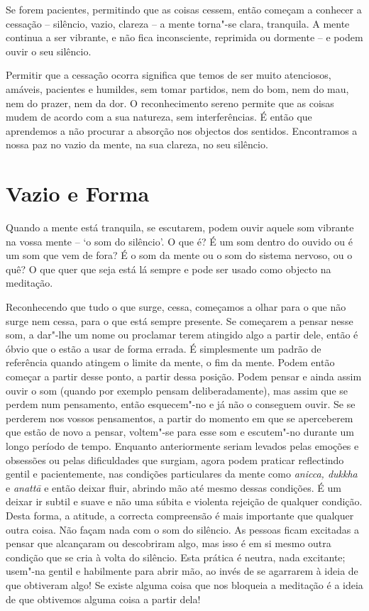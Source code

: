 Se forem pacientes, permitindo que as coisas cessem, então começam a
conhecer a cessação -- silêncio, vazio, clareza -- a mente torna"-se
clara, tranquila. A mente continua a ser vibrante, e não fica
inconsciente, reprimida ou dormente  --  e podem ouvir o seu silêncio.

Permitir que a cessação ocorra significa que temos de ser muito
atenciosos, amáveis, pacientes e humildes, sem tomar partidos, nem do
bom, nem do mau, nem do prazer, nem da dor. O reconhecimento sereno
permite que as coisas mudem de acordo com a sua natureza, sem
interferências. É então que aprendemos a não procurar a absorção nos
objectos dos sentidos. Encontramos a nossa paz no vazio da mente, na sua
clareza, no seu silêncio.

\chapter{Vazio e Forma}

Quando a mente está tranquila, se escutarem, podem ouvir aquele som
vibrante na vossa mente -- `o som do silêncio'. O que é? É um som
dentro do ouvido ou é um som que vem de fora? É o som da mente ou o som
do sistema nervoso, ou o quê? O que quer que seja está lá sempre e pode
ser usado como objecto na meditação.

Reconhecendo que tudo o que surge, cessa, começamos a olhar para o que
não surge nem cessa, para o que está sempre presente. Se começarem a
pensar nesse som, a dar"-lhe um nome ou proclamar terem atingido algo a
partir dele, então é óbvio que o estão a usar de forma errada. É
simplesmente um padrão de referência quando atingem o limite da mente, o
fim da mente. Podem então começar a partir desse ponto, a partir dessa posição. 
Podem pensar e ainda assim ouvir o som (quando por exemplo pensam 
deliberadamente), mas assim que se perdem num pensamento, então 
esquecem"-no e já não o conseguem ouvir. Se se perderem nos 
vossos pensamentos, a partir do momento em que se aperceberem que
estão de novo a pensar, voltem"-se para esse som e escutem"-no durante 
um longo período de tempo. Enquanto anteriormente seriam levados pelas 
emoções e obsessões ou pelas dificuldades que surgiam, 
agora podem praticar reflectindo gentil e pacientemente, nas
condições particulares da mente como \emph{anicca, dukkha} e
\emph{anattā} e então deixar fluir, abrindo mão até mesmo dessas
condições. É um deixar ir subtil e suave e não uma súbita e violenta
rejeição de qualquer condição. Desta forma, a atitude, a correcta compreensão
é mais importante que qualquer outra coisa. Não façam nada com o som
do silêncio. As pessoas ficam excitadas a pensar que alcançaram ou
descobriram algo, mas isso é em si mesmo outra condição que se cria à
volta do silêncio. Esta prática é neutra, nada excitante; usem"-na gentil
e habilmente para abrir mão, ao invés de se agarrarem à ideia de que
obtiveram algo! Se existe alguma coisa que nos bloqueia a meditação é a
ideia de que obtivemos alguma coisa a partir dela!

